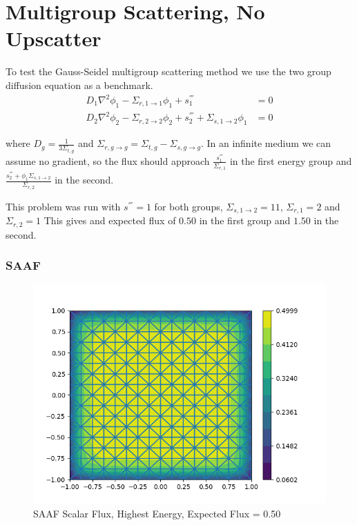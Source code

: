 \section{Multigroup Scattering, No Upscatter}
To test the Gauss-Seidel multigroup scattering method we use the two group diffusion equation as a benchmark. 
\begin{align}
 D_1\nabla^2 \phi_1 - \Sigma_{r, 1 \rightarrow 1} \phi_1 + s_1^{'''} &= 0 \\
 D_2\nabla^2 \phi_2 - \Sigma_{r, 2 \rightarrow 2} \phi_2 + s_2^{'''} + \Sigma_{s, 1 \rightarrow 2} \phi_1 &= 0
\end{align}

where $D_g = \frac{1}{3\Sigma_{t, g}}$ and $\Sigma_{r, g \rightarrow g} = \Sigma_{t, g} - \Sigma_{s, g \rightarrow g}$. In an infinite medium we can assume no gradient, so the flux should approach $\frac{s_1^{'''}}{\Sigma_{r, 1}}$ in the first energy group and $\frac{s_2^{'''} + \phi_1 \Sigma_{s, 1 \rightarrow 2}}{\Sigma_{r, 2}}$ in the second.  

This problem was run with $ s^{'''} = 1$ for both groups, $\Sigma_{s, 1\rightarrow 2} = 11$, $\Sigma_{r, 1} = 2$ and $\Sigma_{r, 2} = 1$ This gives and expected flux of $0.50 $ in the first group and $1.50$ in the second. 

\subsubsection{SAAF}
\begin{figure}[H]
    \centering
    \includegraphics[width=\textwidth]{fig/saaf_multi_group0.png}
    \caption{SAAF Scalar Flux, Highest Energy, Expected Flux = 0.50}
    \label{fig:SAAF_multi_g1}
\end{figure}

